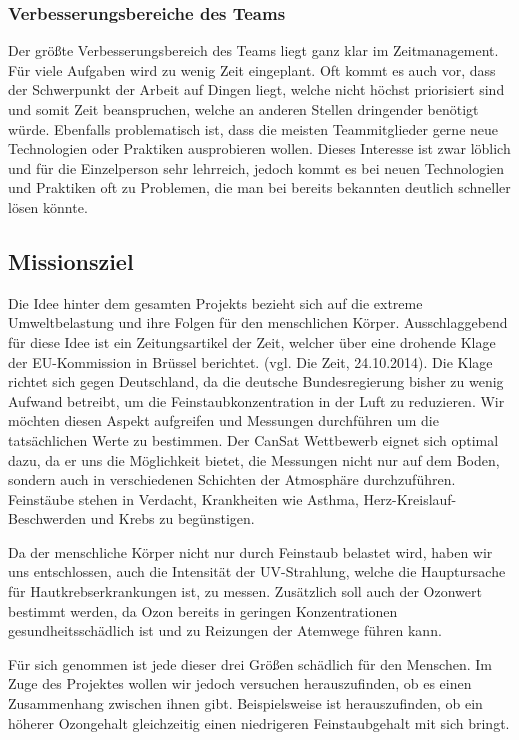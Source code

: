 \subsubsection{Verbesserungsbereiche des Teams}
Der größte Verbesserungsbereich des Teams liegt ganz klar im Zeitmanagement. Für viele Aufgaben wird zu wenig Zeit eingeplant. Oft kommt es auch vor, dass der Schwerpunkt der Arbeit auf Dingen liegt, welche nicht höchst priorisiert sind und somit Zeit beanspruchen, welche an anderen Stellen dringender benötigt würde. Ebenfalls problematisch ist, dass die meisten Teammitglieder gerne neue Technologien oder Praktiken ausprobieren wollen. Dieses Interesse ist zwar löblich und für die Einzelperson sehr lehrreich, jedoch kommt es bei neuen Technologien und Praktiken oft zu Problemen, die man bei bereits bekannten deutlich schneller lösen könnte.

\subsection{Missionsziel}
Die Idee hinter dem gesamten Projekts bezieht sich auf die extreme Umweltbelastung und ihre Folgen für den menschlichen Körper. Ausschlaggebend für diese Idee ist ein Zeitungsartikel der Zeit, welcher über eine drohende Klage der EU-Kommission in Brüssel berichtet. (vgl. Die Zeit, 24.10.2014). Die Klage richtet sich gegen Deutschland, da die deutsche Bundesregierung bisher zu wenig Aufwand betreibt, um die Feinstaubkonzentration in der Luft zu reduzieren. Wir möchten diesen Aspekt aufgreifen und Messungen durchführen um die tatsächlichen Werte zu bestimmen. Der CanSat Wettbewerb eignet sich optimal dazu, da er uns die Möglichkeit bietet, die Messungen nicht nur auf dem Boden, sondern auch in verschiedenen Schichten der Atmosphäre durchzuführen. Feinstäube stehen in Verdacht, Krankheiten wie Asthma, Herz-Kreislauf-Beschwerden und Krebs zu begünstigen.

Da der menschliche Körper nicht nur durch Feinstaub belastet wird, haben wir uns entschlossen, auch die Intensität der UV-Strahlung, welche die Hauptursache für Hautkrebserkrankungen ist, zu messen. Zusätzlich soll auch der Ozonwert bestimmt werden, da Ozon bereits in geringen Konzentrationen gesundheitsschädlich ist und zu Reizungen der Atemwege führen kann.

Für sich genommen ist jede dieser drei Größen schädlich für den Menschen. Im Zuge des Projektes wollen wir jedoch versuchen herauszufinden, ob es einen Zusammenhang zwischen ihnen gibt. Beispielsweise ist herauszufinden, ob ein höherer Ozongehalt gleichzeitig einen niedrigeren Feinstaubgehalt mit sich bringt.

